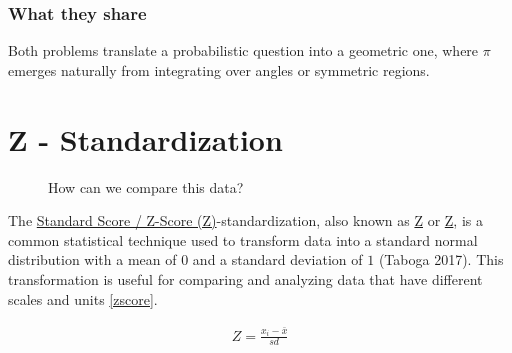 \documentclass[
  a4paper,
]{scrbook}
\begin{document}
\subsubsection{What they share}\label{what-they-share}

Both problems translate a probabilistic question into a geometric one,
where \(\pi\) emerges naturally from integrating over angles or
symmetric regions.

\section{Z - Standardization}\label{z---standardization}

\begin{figure}[ht]


\caption{\label{fig-z-scores-raw}How can we compare this data?}

\end{figure}%

The \hyperref[acronyms_Z]{Standard Score / Z-Score (Z)}-standardization,
also known as \hyperref[acronyms_Z]{Z} or \hyperref[acronyms_Z]{Z}, is a
common statistical technique used to transform data into a standard
normal distribution with a mean of \(0\) and a standard deviation of
\(1\) (Taboga 2017). This transformation is useful for comparing and
analyzing data that have different scales and units \eqref{zscore}.

\begin{align}
Z = \frac{x_i - \bar{x}}{sd} \label{zscore}
\end{align}
\end{document}
